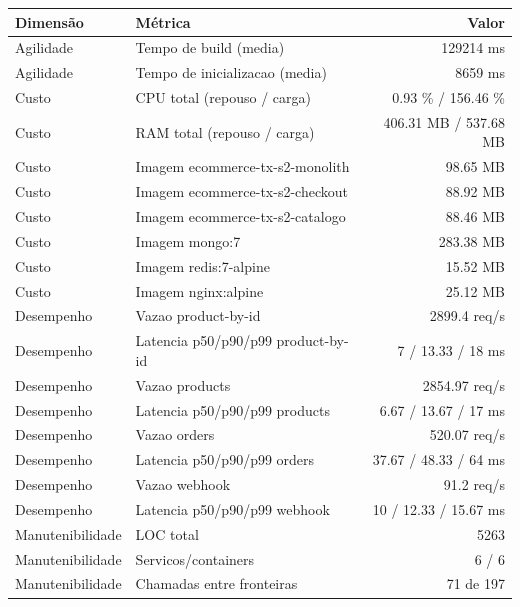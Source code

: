 \begin{quadro}[htb]
  \centering
  \caption{Métricas (ecommerce, transacoes, snapshot-2).}
  \label{qua:metricas-ecommerce-transacoes-snapshot-2}
  \renewcommand{\arraystretch}{1.15}
  \begin{tabular}{|l|l|r|}
    \hline
    \textbf{Dimensão} & \textbf{Métrica} & \textbf{Valor} \\
    \hline
    Agilidade & Tempo de build (media) & 129214 ms \\ \hline
    Agilidade & Tempo de inicializacao (media) & 8659 ms \\ \hline
    Custo & CPU total (repouso / carga) & 0.93 \% / 156.46 \% \\ \hline
    Custo & RAM total (repouso / carga) & 406.31 MB / 537.68 MB \\ \hline
    Custo & Imagem ecommerce-tx-s2-monolith & 98.65 MB \\ \hline
    Custo & Imagem ecommerce-tx-s2-checkout & 88.92 MB \\ \hline
    Custo & Imagem ecommerce-tx-s2-catalogo & 88.46 MB \\ \hline
    Custo & Imagem mongo:7 & 283.38 MB \\ \hline
    Custo & Imagem redis:7-alpine & 15.52 MB \\ \hline
    Custo & Imagem nginx:alpine & 25.12 MB \\ \hline
    Desempenho & Vazao product-by-id & 2899.4 req/s \\ \hline
    Desempenho & Latencia p50/p90/p99 product-by-id & 7 / 13.33 / 18 ms \\ \hline
    Desempenho & Vazao products & 2854.97 req/s \\ \hline
    Desempenho & Latencia p50/p90/p99 products & 6.67 / 13.67 / 17 ms \\ \hline
    Desempenho & Vazao orders & 520.07 req/s \\ \hline
    Desempenho & Latencia p50/p90/p99 orders & 37.67 / 48.33 / 64 ms \\ \hline
    Desempenho & Vazao webhook & 91.2 req/s \\ \hline
    Desempenho & Latencia p50/p90/p99 webhook & 10 / 12.33 / 15.67 ms \\ \hline
    Manutenibilidade & LOC total & 5263 \\ \hline
    Manutenibilidade & Servicos/containers & 6 / 6 \\ \hline
    Manutenibilidade & Chamadas entre fronteiras & 71 de 197 \\ \hline
  \end{tabular}
\end{quadro}
